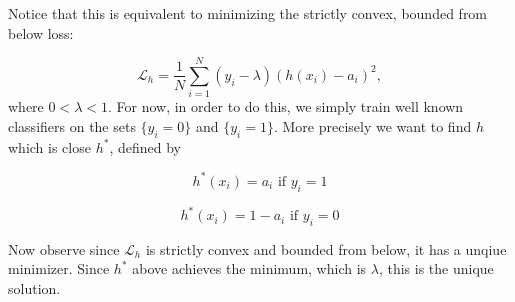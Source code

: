 \documentclass[11pt, oneside]{article}   	%
\begin{document}
Notice that this is equivalent to minimizing the strictly convex, bounded from below loss:

$$ \mathcal{L}_h = \frac{1}{N} \sum_{i=1}^N (y_i-\lambda)(h(x_i) - a_i)^2,$$
where $0 < \lambda < 1$.
For now, in order to do this, we simply train well known classifiers on the sets $\{y_i=0\}$ and $\{y_i=1\}$. More precisely we want to find $h$ which is close $h^*$, defined by

$$ h^*(x_i) = a_i \textrm{ if } y_i=1$$

$$ h^*(x_i) = 1-a_i \textrm{ if } y_i=0$$



Now observe since $\mathcal{L}_h$ is strictly convex and bounded from below, it has a unqiue minimizer. Since $h^*$ above achieves the minimum, which is $\lambda$, this is the unique solution. 
\end{document}
